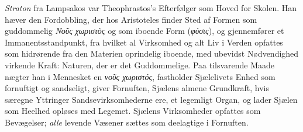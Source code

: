 \documentclass[12pt,a4paper]{book}
\newcommand{\gk}[1]{\textit{#1}}
\begin{document}
\emph{Straton} fra Lampsakos var Theophrastos's Efterfølger
som Hoved for Skolen. Han hæver den Fordobbling, der hos
Aristoteles finder Sted af Formen som guddommelig \gk{Νοῦς}
\gk{χωριστὸς} og som iboende Form (\gk{φύσις}), og gjennemfører et
Immanentsstandpunkt, fra hvilket al Virksomhed og alt Liv i
Verden opfattes som hidrørende fra den Materien oprindelig
iboende, med ubevidst Nødvendighed virkende Kraft: Naturen,
der er det Guddommelige. Paa tilsvarende Maade nægter han
i Mennesket en \gk{νοῦς χωριστός}, fastholder Sjælelivets Enhed
som fornuftigt og sandseligt, giver Fornuften, Sjælens almene
Grundkraft, hvis særegne Yttringer Sandsevirksomhederne ere,
et legemligt Organ, og lader Sjælen som Heelhed opløses med
Legemet. Sjælens Virksomheder opfattes som Bevægelser; \emph{alle}
levende Væsener sættes som deelagtige i Fornuften.
\end{document}
